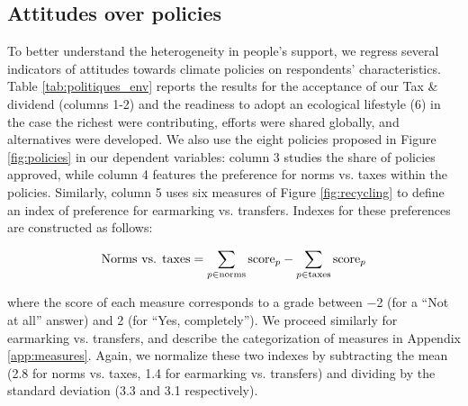 \documentclass[english,5p,authoryear]{elsarticle}
\begin{document}
    \subsection{Attitudes over policies}\label{sec:determinants_attitudes_policies}

To better understand the heterogeneity in people's support, we regress several indicators of attitudes towards climate policies on respondents' characteristics. Table \ref{tab:politiques_env} reports the results for the acceptance of our Tax \& dividend (columns 1-2) and the readiness to adopt an ecological lifestyle (6) in the case the richest were contributing, efforts were shared globally, and alternatives were developed. We also use the eight policies proposed in Figure \ref{fig:policies} in our dependent variables: column 3 studies the share of policies approved, while column 4 features the preference for norms vs. taxes within the policies. Similarly, column 5 uses six measures of Figure \ref{fig:recycling} to define an index of preference for earmarking vs. transfers. Indexes for these preferences are constructed as follows:

\begin{align}
\textnormal{Norms vs. taxes} = \sum_{p \in \textnormal{norms}} \textnormal{score}_{p} - \sum_{p \in \textnormal{taxes}}  \textnormal{score}_{p}
\label{eq:norms_vs_taxes}
\end{align}

\noindent
where the score of each measure corresponds to a grade between $-$2 (for a ``Not at all'' answer) and 2 (for ``Yes, completely''). We proceed similarly for earmarking vs. transfers, and describe the categorization of measures in Appendix \ref{app:measures}. Again, we normalize these two indexes by subtracting the mean (2.8 for norms vs. taxes, 1.4 for earmarking vs. transfers) and dividing by the standard deviation (3.3 and 3.1 respectively).
\end{document}
